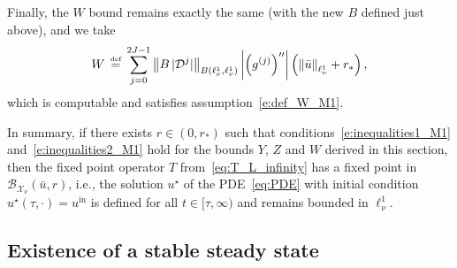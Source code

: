 \documentclass[10pt,a4paper]{article}
\theoremstyle{plain}
\newcommand{\B}{\mathcal{B}}
\renewcommand{\B}{\mathcal{B}}
\newcommand{\D}{\mathcal{D}}
\newcommand{\X}{\mathcal{X}}
\newcommand{\bu}{\bar{u}}
\newcommand{\1}{\mathbf{1}}
\newcommand{\rstar}{r_*}
\newcommand{\uin}{{u^{\mathrm{in}}}}
\newcommand{\bydef}{\,\stackrel{\mbox{\tiny\textnormal{\raisebox{0ex}[0ex][0ex]{def}}}}{=}\,}
\begin{document}
Finally, the $W$ bound remains exactly the same (with the new $B$ defined just above), and we take
\begin{align}
\label{eq:Winfty}
W \bydef \sum_{j=0}^{2J-1} \left\Vert B \, \vert\D^j\vert\right\Vert_{B(\ell^1_\nu,\ell^1_\nu)}   \left \vert \left( g^{(j)} \right)'' \right \vert \left( \left\Vert \bar u \right\Vert_{\ell^1_\nu} + \rstar \right),
\end{align}
which is computable and satisfies assumption~\eqref{e:def_W_M1}.

In summary, if there exists $r\in(0,\rstar)$ such that conditions~\eqref{e:inequalities1_M1} and~\eqref{e:inequalities2_M1} hold for the bounds $Y$, $Z$ and $W$ derived in this section, then the fixed point operator $T$ from~\eqref{eq:T_L_infinity} has a fixed point in $\B_{\X_\nu}(\bu,r)$, i.e., the solution $u^\star$ of the PDE~\eqref{eq:PDE} with initial condition $u^\star(\tau,\cdot) = \uin$ is defined for all $t\in[\tau,\infty)$ and remains bounded in $\ell^1_\nu$.


\subsection{Existence of a stable steady state}
\label{sec:steadystate}
\end{document}
